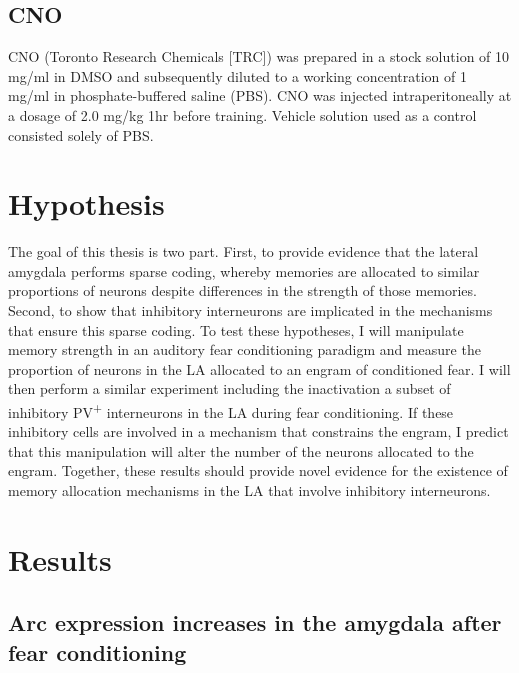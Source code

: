 \documentclass[12pt,a4paperpaper,]{report}
\begin{document}
\section{CNO}\label{cno}

CNO (Toronto Research Chemicals {[}TRC{]}) was prepared in a stock
solution of 10 mg/ml in DMSO and subsequently diluted to a working
concentration of 1 mg/ml in phosphate-buffered saline (PBS). CNO was
injected intraperitoneally at a dosage of 2.0 mg/kg 1hr before training.
Vehicle solution used as a control consisted solely of PBS.  

\chapter{Hypothesis}\label{hypothesis}

The goal of this thesis is two part. First, to provide evidence that the
lateral amygdala performs sparse coding, whereby memories are allocated
to similar proportions of neurons despite differences in the strength of
those memories. Second, to show that inhibitory interneurons are
implicated in the mechanisms that ensure this sparse coding. To test
these hypotheses, I will manipulate memory strength in an auditory fear
conditioning paradigm and measure the proportion of neurons in the LA
allocated to an engram of conditioned fear. I will then perform a
similar experiment including the inactivation a subset of inhibitory
PV\textsuperscript{+} interneurons in the LA during fear conditioning.
If these inhibitory cells are involved in a mechanism that constrains
the engram, I predict that this manipulation will alter the number of
the neurons allocated to the engram. Together, these results should
provide novel evidence for the existence of memory allocation mechanisms
in the LA that involve inhibitory interneurons.

\chapter{Results}\label{results}

\section{Arc expression increases in the amygdala after fear
conditioning}\label{arc-expression-increases-in-the-amygdala-after-fear-conditioning}
\end{document}
